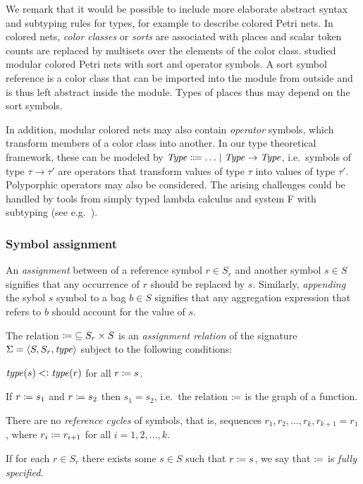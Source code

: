 We remark that it would be possible to include more elaborate abstract syntax and subtyping rules for types, for example to describe colored Petri nets. In colored nets, \emph{color classes} or \emph{sorts} are associated with places and scalar token counts are replaced by multisets over the elements of the color class. \citet{Kindler07modular} studied modular colored Petri nets with sort and operator symbols. A sort symbol reference is a color class that can be imported into the module from outside and is thus left abstract inside the module. Types of places thus may depend on the sort symbols.

In addition, modular colored nets may also contain \emph{operator} symbols, which transform members of a color class into another. In our type theoretical framework, these can be modeled by \(\textrm{\itshape Type\/} \Coloneqq \ldots \mid \textrm{\itshape Type\/} \rightarrow \textrm{\itshape Type\/}\), i.e.~symbols of type \(\tau \to \tau'\) are operators that transform values of type \(\tau\) into values of type \(\tau'\). Polyporphic operators may also be considered. The arising challenges could be handled by tools from simply typed lambda calculus and system F with subtyping (see e.g.~\citet[Chapters~15 and~26]{Pierce02tapl}).

\subsubsection{Symbol assignment}

An \emph{assignment} between of a reference symbol \(r \in S_r\) and another symbol \(s \in S\) signifies that any occurrence of \(r\) should be replaced by \(s\). Similarly, \emph{appending} the sybol \(s\) symbol to a bag \(b \in S\) signifies that any aggregation expression that refers to \(b\) should account for the value of \(s\).

\begin{dfn}
  \label{dfn:rgspn:assign}
  The relation \({\coloneq} \subseteq S_r \times S\) is an \emph{ assignment relation} of the signature \(\Sigma = \langle S, S_r, \textrm{\itshape type\/} \rangle\) subject to the following conditions:
  \begin{compactenum}
  \item \(\textrm{\itshape type\/}(s) \mathrel{<\vcentcolon} \textrm{\itshape type\/}(r)\) for all \(r \coloneq s\). \label{it:rgspn:assign:subtype}
  \item If \(r \coloneq s_1\) and \(r \coloneq s_2\) then \(s_1 = s_2\), i.e.~the relation \(\coloneq\) is the graph of a function. \label{it:rgspn:assign:single}
  \item There are no \emph{reference cycles} of symbols, that is, sequences \(r_1, r_2, \ldots, r_k, r_{k + 1} = r_1\), where \(r_i \coloneq r_{i + 1}\) for all \(i = 1, 2, \ldots, k\). \label{it:rgspn:assign:cycle}
  \end{compactenum}
  If for each \(r \in S_r\) there exists some \(s \in S\) such that \(r \coloneq s\), we say that \(\coloneq\) is \emph{fully specified}.
\end{dfn}

